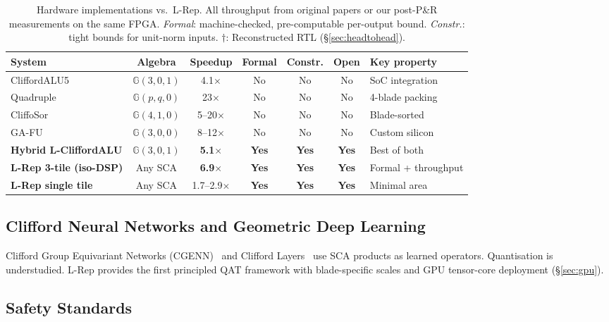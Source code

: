 \documentclass[11pt,a4paper]{article}
\theoremstyle{definition}
\theoremstyle{plain}
\theoremstyle{remark}
\newcommand{\GA}{\mathbb{G}}
\begin{document}
\begin{table}[h]
\centering
\caption{Hardware implementations vs.\ L-Rep.
All throughput from original papers or our post-P\&R measurements on the same FPGA.
\emph{Formal}: machine-checked, pre-computable per-output bound.
\emph{Constr.}: tight bounds for unit-norm inputs.
$\dagger$: Reconstructed RTL (\S\ref{sec:headtohead}).}
\label{tab:related-hw}
\small
\begin{tabular}{lcccccp{2.8cm}}
\toprule
System & Algebra & Speedup & Formal & Constr. & Open & Key property \\
\midrule
CliffordALU5~\cite{cliffordalu5} & $\GA(3,0,1)$ & 4.1$\times$ & No & No & No & SoC integration \\
Quadruple~\cite{quadrupleGA} & $\GA(p,q,0)$ & 23$\times$ & No & No & No & 4-blade packing \\
CliffoSor~\cite{cliffosor} & $\GA(4,1,0)$ & 5--20$\times$ & No & No & No & Blade-sorted \\
GA-FU~\cite{gafu} & $\GA(3,0,0)$ & 8--12$\times$ & No & No & No & Custom silicon \\
\midrule
\textbf{Hybrid L-CliffordALU} & $\GA(3,0,1)$ & \textbf{5.1$\times$} & \textbf{Yes} & \textbf{Yes} & \textbf{Yes} & Best of both \\
\textbf{L-Rep 3-tile (iso-DSP)} & Any SCA & \textbf{6.9$\times$} & \textbf{Yes} & \textbf{Yes} & \textbf{Yes} & Formal + throughput \\
\textbf{L-Rep single tile} & Any SCA & 1.7--2.9$\times$ & \textbf{Yes} & \textbf{Yes} & \textbf{Yes} & Minimal area \\
\bottomrule
\end{tabular}
\end{table}

\subsection{Clifford Neural Networks and Geometric Deep Learning}

Clifford Group Equivariant Networks (CGENN)~\cite{ruhe2023} and Clifford
Layers~\cite{brandstetter2023} use SCA products as learned operators.
Quantisation is understudied.
L-Rep provides the first principled QAT framework with blade-specific
scales and GPU tensor-core deployment (\S\ref{sec:gpu}).

\subsection{Safety Standards}
\end{document}
